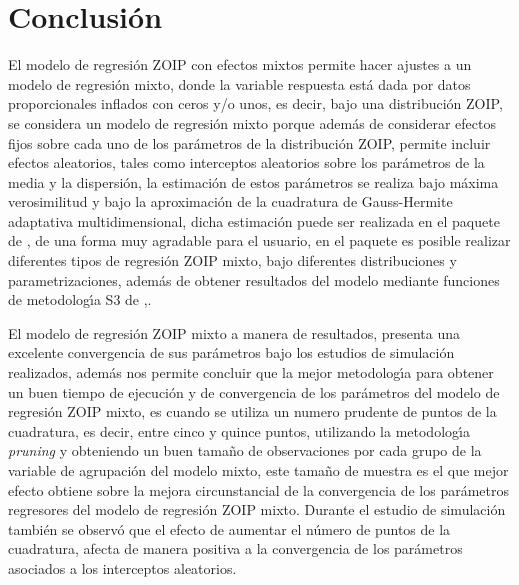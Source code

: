 
\section{Conclusi\'{o}n}

El modelo de regresi\'{o}n ZOIP con efectos mixtos permite hacer ajustes a un modelo de regresi\'{o}n mixto, donde la variable respuesta est\'{a} dada por datos proporcionales inflados con ceros y/o unos, es decir, bajo una distribuci\'{o}n ZOIP, se considera un modelo de regresi\'{o}n mixto porque adem\'{a}s de considerar efectos fijos sobre cada uno de los par\'{a}metros de la distribuci\'{o}n ZOIP, permite incluir efectos aleatorios, tales como interceptos aleatorios sobre los par\'{a}metros de la media y la dispersi\'{o}n, la estimaci\'{o}n de estos par\'{a}metros se realiza bajo m\'{a}xima verosimilitud y bajo la aproximaci\'{o}n de la cuadratura de Gauss-Hermite adaptativa multidimensional, dicha estimaci\'{o}n puede ser realizada en el paquete  de , de una forma muy agradable para el usuario, en el paquete es posible realizar diferentes tipos de regresi\'{o}n ZOIP mixto, bajo diferentes distribuciones y parametrizaciones, adem\'{a}s de obtener resultados del modelo mediante funciones de metodolog\'{\i}a S3 de ,.

El modelo de regresi\'{o}n ZOIP mixto a manera de resultados, presenta una excelente convergencia de sus par\'{a}metros bajo los estudios de simulaci\'{o}n realizados, adem\'{a}s nos permite concluir que la mejor metodolog\'{\i}a para obtener un buen tiempo de ejecuci\'{o}n y de convergencia de los par\'{a}metros del modelo de regresi\'{o}n ZOIP mixto, es cuando se utiliza un numero prudente de puntos de la cuadratura, es decir, entre cinco y quince puntos, utilizando la metodolog\'{\i}a \textit{pruning} y obteniendo un buen tama\~{n}o de observaciones por cada grupo de la variable de agrupaci\'{o}n del modelo mixto, este tama\~{n}o de muestra es el que mejor efecto obtiene sobre la mejora circunstancial de la convergencia de los par\'{a}metros regresores del modelo de regresi\'{o}n ZOIP mixto. Durante el estudio de simulaci\'{o}n tambi\'{e}n se observ\'{o} que el efecto de aumentar el n\'{u}mero de puntos de la cuadratura, afecta de manera positiva a la convergencia de los par\'{a}metros asociados a los interceptos aleatorios.
